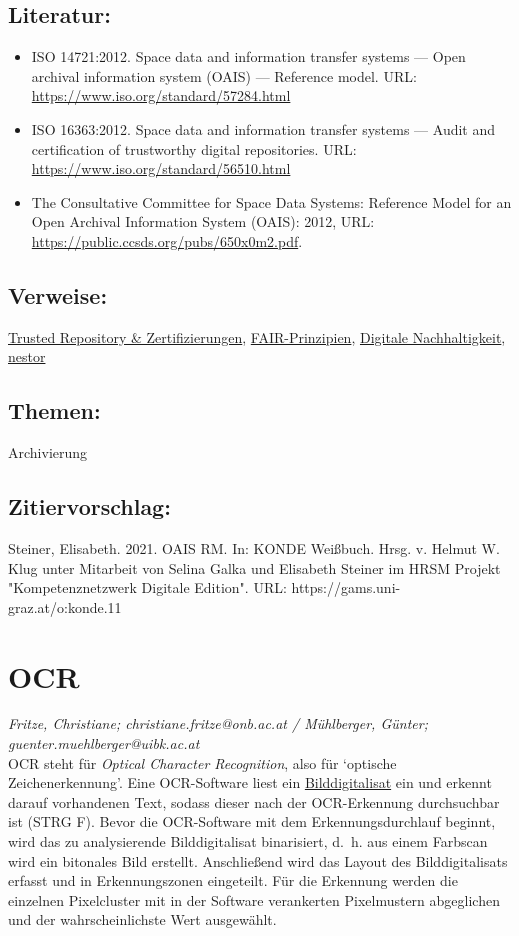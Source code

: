 \documentclass{article}
\begin{document}
        \subsection*{Literatur:}\begin{itemize}\item ISO 14721:2012. Space data and information transfer systems — Open archival information system (OAIS) — Reference model. URL: \url{https://www.iso.org/standard/57284.html}\item ISO 16363:2012. Space data and information transfer systems — Audit and certification of trustworthy digital repositories. URL: \url{https://www.iso.org/standard/56510.html}\item The Consultative Committee for Space Data Systems: Reference Model for an Open Archival Information System (OAIS): 2012, URL: \url{https://public.ccsds.org/pubs/650x0m2.pdf}.\end{itemize}\subsection*{Verweise:}\href{https://gams.uni-graz.at/o:konde.13}{Trusted Repository & Zertifizierungen}, \href{https://gams.uni-graz.at/o:konde.7}{FAIR-Prinzipien}, \href{https://gams.uni-graz.at/o:konde.6}{Digitale Nachhaltigkeit}, \href{https://gams.uni-graz.at/o:konde.4}{nestor}\subsection*{Themen:}Archivierung\subsection*{Zitiervorschlag:}Steiner, Elisabeth. 2021. OAIS RM. In: KONDE Weißbuch. Hrsg. v. Helmut W. Klug unter Mitarbeit von Selina Galka und Elisabeth Steiner im HRSM Projekt "Kompetenznetzwerk Digitale Edition". URL: https://gams.uni-graz.at/o:konde.11\newpage\section*{OCR} \emph{Fritze, Christiane; christiane.fritze@onb.ac.at / Mühlberger, Günter;
                  guenter.muehlberger@uibk.ac.at }\\
        
    OCR steht für \emph{Optical Character Recognition}, also für
                  ‘optische Zeichenerkennung’. Eine OCR-Software liest ein \href{http://gams.uni-graz.at/o:konde.37}{Bilddigitalisat} ein und erkennt darauf vorhandenen
                  Text, sodass dieser nach der OCR-Erkennung durchsuchbar ist (STRG F). Bevor die
                  OCR-Software mit dem Erkennungsdurchlauf beginnt, wird das zu analysierende
                  Bilddigitalisat binarisiert, d. h. aus einem Farbscan wird ein bitonales Bild
                  erstellt. Anschließend wird das Layout des Bilddigitalisats erfasst und in
                  Erkennungszonen eingeteilt. Für die Erkennung werden die einzelnen Pixelcluster
                  mit in der Software verankerten Pixelmustern abgeglichen und der wahrscheinlichste
                  Wert ausgewählt. \\
            
\end{document}
